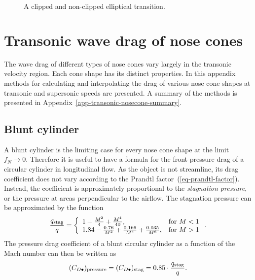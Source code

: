 \begin{figure}[p]
\vspace{5mm}
\begin{center}
\end{center}
\caption{A clipped and non-clipped elliptical transition.}
\label{fig-transition-clip}
\end{figure}





\chapter{Transonic wave drag of nose cones}
\label{app-nosecone-drag-method}

The wave drag of different types of nose cones vary largely in the
transonic velocity region.  Each cone shape has its distinct
properties.  In this appendix methods for calculating and
interpolating the drag of various nose cone shapes at transonic and
supersonic speeds are presented.  A summary of the methods is
presented in Appendix~\ref{app-transonic-nosecone-summary}.



\section{Blunt cylinder}
\label{app-blunt-cylinder-drag}

A blunt cylinder is the limiting case for every nose cone shape at the
limit $f_N\rightarrow 0$.  Therefore it is useful to have a formula
for the front pressure drag of a circular cylinder in longitudinal
flow.  As the object is not streamline, its drag coefficient does not
vary according to the Prandtl factor~(\ref{eq-prandtl-factor}).
Instead, the coefficient is approximately proportional to the
{\it stagnation pressure}, or the pressure at areas perpendicular to
the airflow.  The stagnation pressure can be approximated by the
function~\cite[pp.~15-2,~16-3]{hoerner}
%
\begin{equation}
\frac{q_{\rm stag}}{q} =
\left\{
\begin{array}{ll}
1 + \frac{M^2}{4} + \frac{M^4}{40}, & \mbox{for\ } M < 1 \\
1.84 - \frac{0.76}{M^2} + \frac{0.166}{M^4} + \frac{0.035}{M^6}, &
   \mbox{for\ } M > 1
\end{array}
\right. .
\end{equation}
%
The pressure drag coefficient of a blunt circular cylinder as a
function of the Mach number can then be written as
%
\begin{equation}
(C_{D\bullet})_{\rm pressure} = 
(C_{D\bullet})_{\rm stag} = 0.85 \cdot \frac{q_{\rm stag}}{q}.
\label{eq-blunt-cylinder-drag}
\end{equation}





